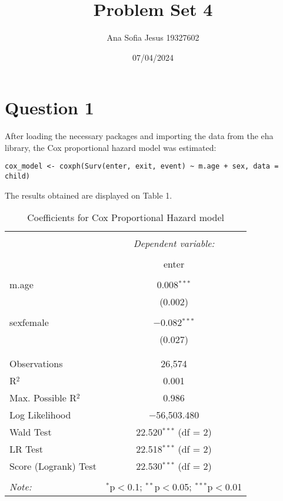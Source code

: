 \documentclass[oneside]{article}
\title{Problem Set 4}
\author{Ana Sofia Jesus 19327602}
\date{07/04/2024}
\begin{document}
\maketitle

\section*{Question 1}

After loading the necessary packages and importing the data from the eha library, the Cox proportional hazard model was estimated:
\begin{verbatim}
cox_model <- coxph(Surv(enter, exit, event) ~ m.age + sex, data = child)
\end{verbatim}

The results obtained are displayed on Table 1. 

\begin{table}[!htbp] \centering 
  \caption{Coefficients for Cox Proportional Hazard model} 
  \label{} 
\begin{tabular}{@{\extracolsep{5pt}}lc} 
\\[-1.8ex]\hline 
\hline \\[-1.8ex] 
 & \multicolumn{1}{c}{\textit{Dependent variable:}} \\ 
\cline{2-2} 
\\[-1.8ex] & enter \\ 
\hline \\[-1.8ex] 
 m.age & 0.008$^{***}$ \\ 
  & (0.002) \\ 
  & \\ 
 sexfemale & $-$0.082$^{***}$ \\ 
  & (0.027) \\ 
  & \\ 
\hline \\[-1.8ex] 
Observations & 26,574 \\ 
R$^{2}$ & 0.001 \\ 
Max. Possible R$^{2}$ & 0.986 \\ 
Log Likelihood & $-$56,503.480 \\ 
Wald Test & 22.520$^{***}$ (df = 2) \\ 
LR Test & 22.518$^{***}$ (df = 2) \\ 
Score (Logrank) Test & 22.530$^{***}$ (df = 2) \\ 
\hline 
\hline \\[-1.8ex] 
\textit{Note:}  & \multicolumn{1}{r}{$^{*}$p$<$0.1; $^{**}$p$<$0.05; $^{***}$p$<$0.01} \\ 
\end{tabular} 
\end{table} 
 
\end{document}
